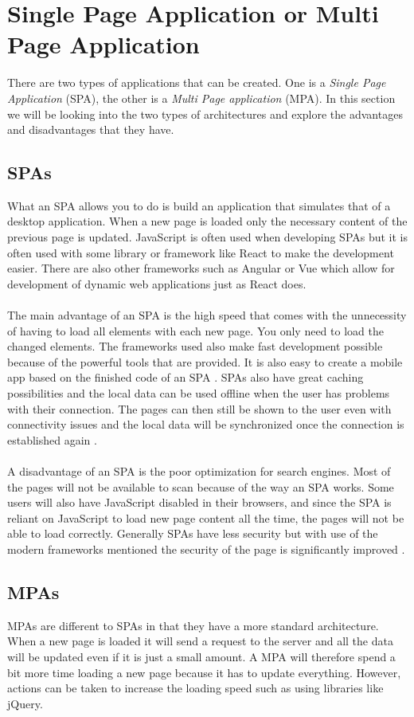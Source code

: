 \section{Single Page Application or Multi Page Application}
There are two types of applications that can be created.
One is a \textit{Single Page Application} (SPA), the other is a \textit{Multi Page application} (MPA).
In this section we will be looking into the two types of architectures and explore the advantages and disadvantages that they have.

\subsection{SPAs}
What an SPA allows you to do is build an application that simulates that of a desktop application. 
When a new page is loaded only the necessary content of the previous page is updated.
JavaScript is often used when developing SPAs but it is often used with some library or framework like React to make the development easier.
There are also other frameworks such as Angular or Vue which allow for development of dynamic web applications just as React does. 
\\\\
The main advantage of an SPA is the high speed that comes with the unnecessity of having to load all elements with each new page.
You only need to load the changed elements. 
The frameworks used also make fast development possible because of the powerful tools that are provided. 
It is also easy to create a mobile app based on the finished code of an SPA \cite{SPAvsMPAMerehead}.
SPAs also have great caching possibilities and the local data can be used offline when the user has problems with their connection. 
The pages can then still be shown to the user even with connectivity issues and the local data will be synchronized once the connection is established again \cite{SPAvsMPARuby}.
\\\\
A disadvantage of an SPA is the poor optimization for search engines.
Most of the pages will not be available to scan because of the way an SPA works. 
Some users will also have JavaScript disabled in their browsers, and since the SPA is reliant on JavaScript to load new page content all the time, the pages will not be able to load correctly.
Generally SPAs have less security but with use of the modern frameworks mentioned the security of the page is significantly improved \cite{SPAvsMPAMerehead}.

\subsection{MPAs}
MPAs are different to SPAs in that they have a more standard architecture.
When a new page is loaded it will send a request to the server and all the data will be updated even if it is just a small amount.
A MPA will therefore spend a bit more time loading a new page because it has to update everything.
However, actions can be taken to increase the loading speed such as using libraries like jQuery.

